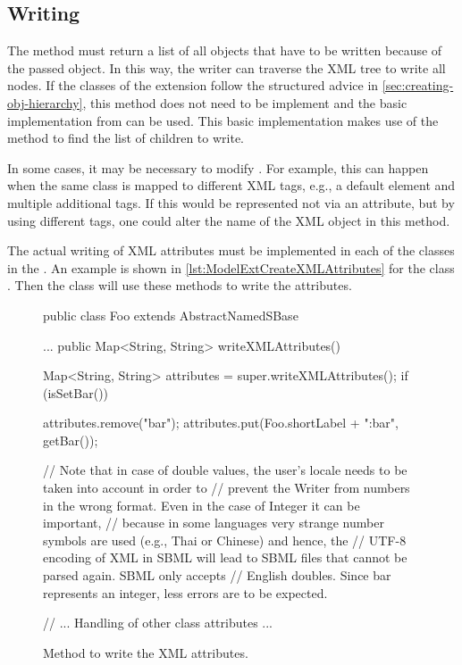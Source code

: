 \subsection{Writing}

The method   must return a list of all
objects that have to be written because of the passed object.  In this way,
the writer can traverse the XML tree to write all nodes. If the classes of the
extension follow the structured advice in \vref{sec:creating-obj-hierarchy}, this
method does not need to be implement and the basic implementation from 
can be used. This basic implementation makes use of the method 
to find the list of children to write.

In some cases, it may be necessary to modify .  For example, this can happen when the same class is mapped to
different XML tags, e.g., a default element and multiple additional tags.
If this would be represented not via an attribute, but by using different
tags, one could alter the name of the XML object in this method.

The actual writing of XML attributes must be implemented in each of the
classes in the .  An example is shown in 
\vref{lst:ModelExtCreateXMLAttributes} for the class .
Then the  class will use these methods to write
the attributes.

\begin{figure}[htb]
  \vspace*{-1ex}
  \begin{example}[numbers=left]
public class Foo extends AbstractNamedSBase {
  ...
  public Map<String, String> writeXMLAttributes() {
    Map<String, String> attributes = super.writeXMLAttributes();
    if (isSetBar()) {
      attributes.remove("bar");
      attributes.put(Foo.shortLabel + ":bar", getBar());

      // Note that in case of double values, the user's locale needs to be taken into account in order to
      // prevent the Writer from numbers in the wrong format. Even in the case of Integer it can be important, 
      // because in some languages very strange number symbols are used (e.g., Thai or Chinese) and hence, the
      // UTF-8 encoding of XML in SBML will lead to SBML files that cannot be parsed again. SBML only accepts 
      // English doubles. Since bar represents an integer, less errors are to be expected.
    }

    // ... Handling of other class attributes ...
  }
}\end{example}
  \caption{Method to write the XML attributes.}
  \label{lst:ModelExtCreateXMLAttributes}
\end{figure}


